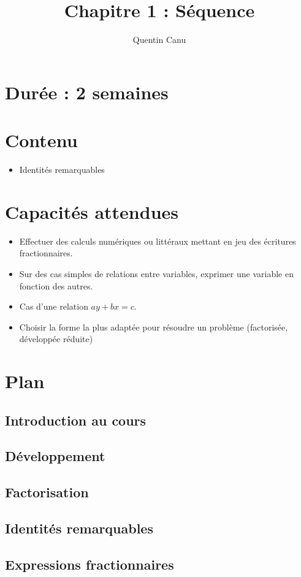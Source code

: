 \documentclass{article}
\title{Chapitre 1 : Séquence}
\author{Quentin Canu}
\date{}
\begin{document}
\maketitle
\section*{Durée : 2 semaines}
\section*{Contenu}
\begin{itemize}
\item Identités remarquables
\end{itemize}
\section*{Capacités attendues}
\begin{itemize}
\item Effectuer des calculs numériques ou littéraux mettant en jeu des écritures fractionnaires.
\item Sur des cas simples de relations entre variables, exprimer une variable en fonction des autres.
\item Cas d'une relation $ay + bx = c$.
\item Choisir la forme la plus adaptée pour résoudre un problème (factorisée, développée réduite)
\end{itemize}
\section*{Plan}
\subsection{Introduction au cours}
\subsection{Développement}
\subsection{Factorisation}
\subsection{Identités remarquables}
\subsection{Expressions fractionnaires}
\end{document}
